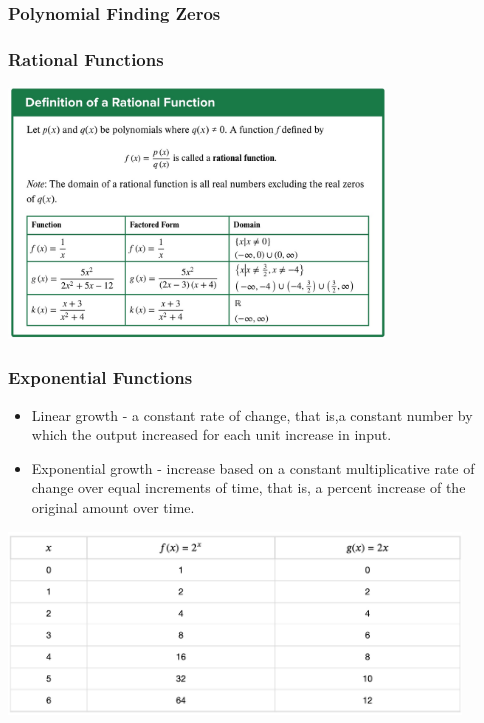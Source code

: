 \documentclass{beamer}
\begin{document}
\begin{frame}\frametitle{Polynomial Finding Zeros}

\begin{center}

\end{center}

\end{frame}

\begin{frame}\frametitle{Rational Functions}

\begin{center}
\includegraphics[width=10cm]{fig/ratfun1.jpg}
\end{center}

\end{frame}



\begin{frame}\frametitle{Exponential Functions}
\begin{itemize}
\item Linear growth - a constant rate of change, that is,a constant number by which the output increased for each unit increase in input.
\item Exponential growth - increase based on a constant multiplicative rate of change over equal increments of time, that is, a percent increase of the original amount over time.
\end{itemize}

\begin{center}
\includegraphics[width=12cm]{fig/exp_growth.jpg}
\end{center}

\end{frame}
\end{document}
